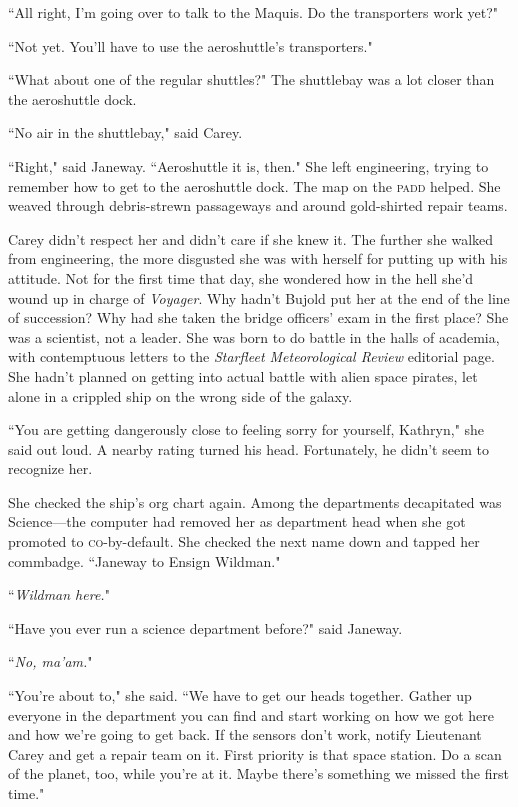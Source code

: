 \documentclass[twoside,letterpaper,12pt]{memoir}
\begin{document}
``All right, I'm going over to talk to the Maquis. Do the transporters work yet?"

``Not yet. You'll have to use the aeroshuttle's transporters."

``What about one of the regular shuttles?" The shuttlebay was a lot closer than the aeroshuttle dock.

``No air in the shuttlebay," said Carey.

``Right," said Janeway. ``Aeroshuttle it is, then." She left engineering, trying to remember how to get to the aeroshuttle dock. The map on the \textsc{padd} helped. She weaved through debris-strewn passageways and around gold-shirted repair teams.

Carey didn't respect her and didn't care if she knew it. The further she walked from engineering, the more disgusted she was with herself for putting up with his attitude. Not for the first time that day, she wondered how in the hell she'd wound up in charge of \textit{Voyager}. Why hadn't Bujold put her at the end of the line of succession? Why had she taken the bridge officers' exam in the first place? She was a scientist, not a leader. She was born to do battle in the halls of academia, with contemptuous letters to the \textit{Starfleet Meteorological Review} editorial page. She hadn't planned on getting into actual battle with alien space pirates, let alone in a crippled ship on the wrong side of the galaxy.

``You are getting dangerously close to feeling sorry for yourself, Kathryn," she said out loud. A nearby rating turned his head. Fortunately, he didn't seem to recognize her.

She checked the ship's org chart again. Among the departments decapitated was Science---the computer had removed her as department head when she got promoted to \textsc{co}-by-default. She checked the next name down and tapped her commbadge. ``Janeway to Ensign Wildman."

``\textit{Wildman here.}"

``Have you ever run a science department before?" said Janeway.

``\textit{No, ma'am.}"

``You're about to," she said. ``We have to get our heads together. Gather up everyone in the department you can find and start working on how we got here and how we're going to get back. If the sensors don't work, notify Lieutenant Carey and get a repair team on it. First priority is that space station. Do a scan of the planet, too, while you're at it. Maybe there's something we missed the first time."
\end{document}
